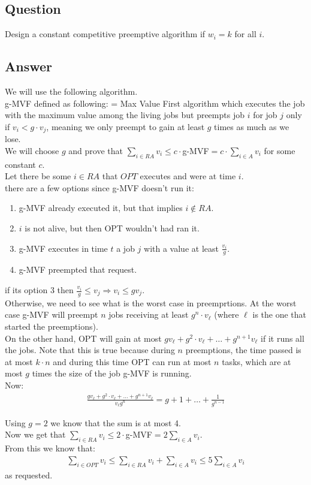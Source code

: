 \subsection*{Question}
Design a constant competitive preemptive algorithm if $w_i = k$ for all $i$.

\subsection*{Answer}
We will use the following algorithm.\\
g-MVF defined as following: = Max Value First algorithm which executes the job with the maximum value among the living jobs but preempts job $i$ for job $j$ only if $v_i < g\cdot v_j$, meaning we only preempt to gain at least $g$ times as much as we lose.\\
We will choose $g$ and prove that $ \sum_{i\in RA} v_i \leq c\cdot $g-MVF$ = c\cdot\sum_{i\in A}v_i$ for some constant $c$.\\
Let there be some $i\in RA$ that $OPT$ executes and were at time $i$.\\
there are a few options since g-MVF doesn't run it:
\begin{enumerate}
    \item g-MVF already executed it, but that implies $i\notin RA$.
    \item $i$ is not alive, but then OPT wouldn't had ran it.
    \item g-MVF executes in time $t$ a job $j$ with a value at least $\frac{v_i}{g}$.
    \item g-MVF preempted that request. 
\end{enumerate}

if its option 3 then $\frac{v_i}{g} \leq v_j\Rightarrow v_i \leq gv_j$.\\
Otherwise, we need to see what is the worst case in preemprtions. At the worst case g-MVF will preempt $n$ jobs receiving at least $g^n\cdot v_\ell$ (where $\ell$ is the one that started the preemptions).\\
On the other hand, OPT will gain at most $gv_\ell + g^2\cdot v_\ell +\dots+g^{n+1}v_\ell$ if it runs all the jobs. Note that this is true because during $n$ preemptions, the time passed is at most $k\cdot n$ and during this time OPT can run at most $n$ tasks, which are at most $g$ times the size of the job g-MVF is running.\\
Now:
\begin{gather*}
    \frac{gv_\ell + g^2\cdot v_\ell +\dots+g^{n+1}v_\ell}{v_\ell g^n} =
    g + 1 + \dots +\frac{1}{g^{n-1}}
\end{gather*}

Using $g=2$ we know that the sum is at most 4.\\
Now we get that $ \sum_{i\in RA} v_i \leq 2\cdot $g-MVF$ = 2 \sum_{i\in A}v_i$.\\
From this we know that:
\begin{gather*}
    \sum_{i\in OPT} v_i \leq \sum_{i\in RA} v_i + \sum_{i\in A} v_i \leq 5\sum_{i\in A} v_i
\end{gather*}
as requested.
